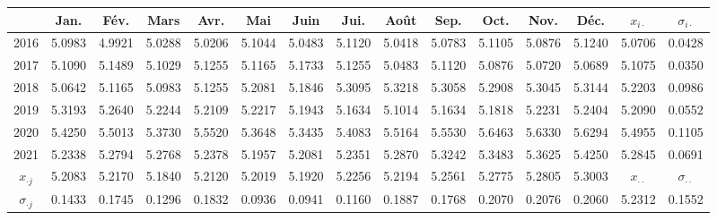 
\begin{tabular}{ccccccccccccccc}
        \toprule
         & Jan. & Fév. & Mars & Avr. & Mai & Juin & Jui. & Août & Sep. & Oct. & Nov. & Déc. & $x_{i\cdot}$ & $\sigma_{i\cdot}$ \\
        \midrule
        2016 & 5.0983 & 4.9921 & 5.0288 & 5.0206 & 5.1044 & 5.0483 & 5.1120 & 5.0418 & 5.0783 & 5.1105 & 5.0876 & 5.1240 & 5.0706 & 0.0428 \\ 
        2017 & 5.1090 & 5.1489 & 5.1029 & 5.1255 & 5.1165 & 5.1733 & 5.1255 & 5.0483 & 5.1120 & 5.0876 & 5.0720 & 5.0689 & 5.1075 & 0.0350 \\ 
        2018 & 5.0642 & 5.1165 & 5.0983 & 5.1255 & 5.2081 & 5.1846 & 5.3095 & 5.3218 & 5.3058 & 5.2908 & 5.3045 & 5.3144 & 5.2203 & 0.0986 \\ 
        2019 & 5.3193 & 5.2640 & 5.2244 & 5.2109 & 5.2217 & 5.1943 & 5.1634 & 5.1014 & 5.1634 & 5.1818 & 5.2231 & 5.2404 & 5.2090 & 0.0552 \\ 
        2020 & 5.4250 & 5.5013 & 5.3730 & 5.5520 & 5.3648 & 5.3435 & 5.4083 & 5.5164 & 5.5530 & 5.6463 & 5.6330 & 5.6294 & 5.4955 & 0.1105 \\ 
        2021 & 5.2338 & 5.2794 & 5.2768 & 5.2378 & 5.1957 & 5.2081 & 5.2351 & 5.2870 & 5.3242 & 5.3483 & 5.3625 & 5.4250 & 5.2845 & 0.0691 \\
        \midrule
        $x_{\cdot j}$ & 5.2083 & 5.2170 & 5.1840 & 5.2120 & 5.2019 & 5.1920 & 5.2256 & 5.2194 & 5.2561 & 5.2775 & 5.2805 & 5.3003 & $x_{\cdot\cdot}$ & $\sigma_{\cdot\cdot}$ \\ 
        $\sigma_{\cdot j}$ & 0.1433 & 0.1745 & 0.1296 & 0.1832 & 0.0936 & 0.0941 & 0.1160 & 0.1887 & 0.1768 & 0.2070 & 0.2076 & 0.2060 & 5.2312 & 0.1552 \\ 
        \bottomrule
    \end{tabular}
